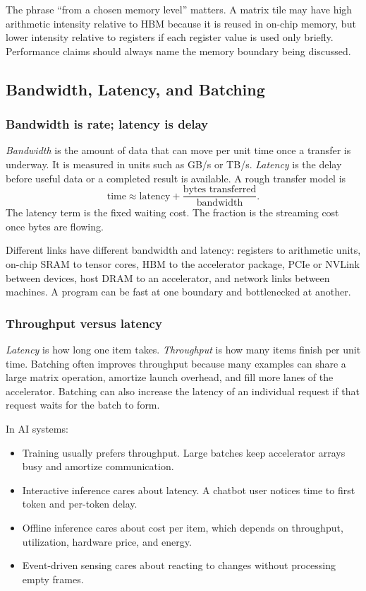 The phrase ``from a chosen memory level'' matters. A matrix tile may have high arithmetic intensity relative to HBM because it is reused in on-chip memory, but lower intensity relative to registers if each register value is used only briefly. Performance claims should always name the memory boundary being discussed.

\subsection{Bandwidth, Latency, and Batching}

\subsubsection{Bandwidth is rate; latency is delay}

\emph{Bandwidth} is the amount of data that can move per unit time once a transfer is underway. It is measured in units such as GB/s or TB/s. \emph{Latency} is the delay before useful data or a completed result is available. A rough transfer model is
\[
  \text{time} \approx \text{latency} +
  \frac{\text{bytes transferred}}{\text{bandwidth}}.
\]
The latency term is the fixed waiting cost. The fraction is the streaming cost once bytes are flowing.

Different links have different bandwidth and latency: registers to arithmetic units, on-chip SRAM to tensor cores, HBM to the accelerator package, PCIe or NVLink between devices, host DRAM to an accelerator, and network links between machines. A program can be fast at one boundary and bottlenecked at another.

\subsubsection{Throughput versus latency}

\emph{Latency} is how long one item takes. \emph{Throughput} is how many items finish per unit time. Batching often improves throughput because many examples can share a large matrix operation, amortize launch overhead, and fill more lanes of the accelerator. Batching can also increase the latency of an individual request if that request waits for the batch to form.

In AI systems:

\begin{itemize}[leftmargin=*]
  \item Training usually prefers throughput. Large batches keep accelerator arrays busy and amortize communication.
  \item Interactive inference cares about latency. A chatbot user notices time to first token and per-token delay.
  \item Offline inference cares about cost per item, which depends on throughput, utilization, hardware price, and energy.
  \item Event-driven sensing cares about reacting to changes without processing empty frames.
\end{itemize}

